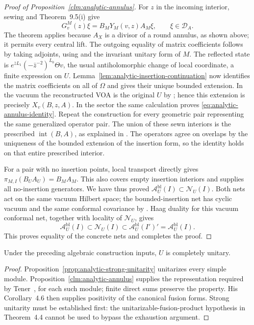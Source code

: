 \begin{proof}[Proof of Proposition~\ref{clm:analytic-annulus}]
For $z$ in the incoming interior, sewing
\cite[Section~6.2, formula~(76)]{HTNet} and Theorem~9.5(i) give
\[
 G_v^M(z)\xi=B_MY_M(v,z)A_M\xi,
 \qquad \xi\in\mathcal D_A.
\]
The theorem applies because $A_X$ is a divisor of a round annulus,
as shown above; it permits every central lift.  The outgoing equality
of matrix coefficients follows by taking adjoints, using
\cite[Proposition~6.19 and formula~(81)]{HTNet} and the invariant
unitary form of $M$.  The reflected state is
$e^{\bar zL_1}(-\bar z^{-2})^{L_0}\Theta v$, the usual
antiholomorphic change of local coordinate, a finite expression on $U$.
Lemma~\ref{lem:analytic-insertion-continuation} now identifies the
matrix coefficients on all of $\Omega$ and gives their unique bounded
extension.  In the vacuum the reconstructed VOA is the original $U$
by \cite[Theorem~8.9]{HTNet}; hence this extension is precisely
$X_v(B,z,A)$.  In the sector the same calculation proves
\eqref{eq:analytic-annulus-identity}.
Repeat the construction for every geometric pair representing the
same generalized operator pair.  The union of these sewn interiors
is the prescribed $\operatorname{int}(B,A)$, as explained in
\cite[proof of Theorem~4.28]{TenFields}.  The operators agree on
overlaps by the uniqueness of the bounded extension of the insertion
form, so the identity holds on that entire prescribed interior.

For a pair with no insertion points, local transport directly gives
$\pi_{M,I}(B_UA_U)=B_MA_M$.  This also covers empty insertion
interiors and supplies all no-insertion generators.  We have thus
proved $\mathcal A_U^{\mathrm{bl}}(I)\subset\mathcal N_U(I)$.
Both nets act on the same vacuum Hilbert space; the bounded-insertion
net has cyclic vacuum and the same conformal covariance by
\cite[Proposition~4.13]{TenFields}.  Haag duality for this vacuum
conformal net, together with locality of $\mathcal N_U$, gives
\[
 \mathcal A_U^{\mathrm{bl}}(I)\subset\mathcal N_U(I)
 \subset\mathcal A_U^{\mathrm{bl}}(I')'
 =\mathcal A_U^{\mathrm{bl}}(I).
\]
This proves equality of the concrete nets and completes the proof.
\end{proof}

\begin{theorem}
\label{thm:analytic-complete-unitarity}
Under the preceding algebraic construction inputs, $U$ is completely
unitary.
\end{theorem}
\begin{proof}
Proposition~\ref{prop:analytic-strong-unitarity} unitarizes every simple
module.  Proposition~\ref{clm:analytic-annulus} supplies the representation
required by
Tener~\cite[Definition~2.18]{TenFusion}, for each such module; finite direct sums
preserve the property.  His Corollary~4.6 then supplies positivity of
the canonical fusion forms.  Strong unitarity must be established first:
the unitarizable-fusion-product hypothesis in Theorem~4.4 cannot be used
to bypass the exhaustion argument.
\end{proof}

